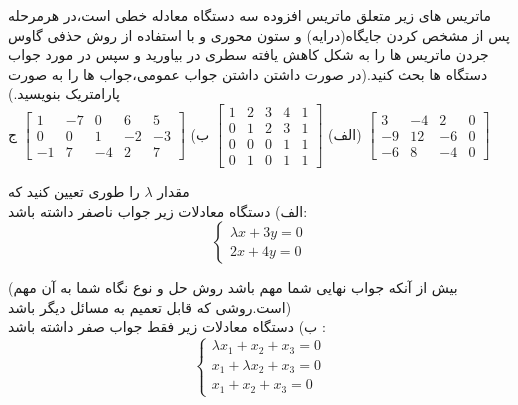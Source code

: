 \documentclass{article}
\begin{document}
\clearpage
{}  ماتریس  های زیر متعلق ماتریس افزوده سه دستگاه معادله خطی است،در هرمرحله پس از مشخص  کردن جایگاه(درایه) و ستون محوری و با استفاده از روش حذفی گاوس جردن ماتریس ها را به شکل کاهش یافته سطری در بیاورید و سپس در مورد جواب دستگاه ها بحث کنید.(در صورت داشتن داشتن جواب عمومی،جواب ها را به صورت پارامتریک بنویسید.)
\\
الف)
${\begin{bmatrix}
		1&2&3&4&1\\
		0&1&2&3&1\\
		0&0&0&1&1\\
		0&1&0&1&1
		\end{bmatrix}}$
	\qquad
	ب)
$\begin{bmatrix}
1&-7&0&6&5\\
0&0&1&-2&-3\\
-1&7&-4&2&7
\end{bmatrix}
$
\qquad
ج)
$\begin{bmatrix}
3&-4&2&0\\
-9&12&-6&0\\
-6&8&-4&0
\end{bmatrix}$

مقدار 
		$\lambda$
		را طوری تعیین کنید که 
		\\
		الف) دستگاه معادلات زیر جواب ناصفر داشته باشد:
	\begin{equation*}
	 \left\{
	\begin{array}{rl}
	 \lambda x+3y=0\\
	 2x+4y=0
	\end{array} \right.
	\end{equation*}
	
	(بیش از آنکه جواب نهایی شما مهم باشد روش حل و نوع نگاه شما به آن مهم است.روشی که قابل تعمیم به مسائل دیگر باشد)
	\\
	ب) دستگاه معادلات زیر فقط جواب صفر داشته باشد :
		\begin{equation*}
	\left\{
	\begin{array}{rl}
	\lambda x_1+x_2+x_3=0\\
	x_1+\lambda x_2+x_3=0\\
	x_1+x_2+x_3=0
	\end{array} \right.
	\end{equation*}
	
\end{document}
